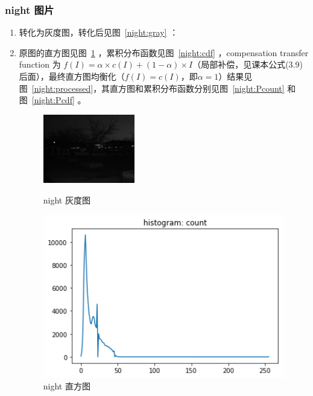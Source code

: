 \documentclass[a4paper,UTF8]{article}
\numberwithin{equation}{section}
\begin{document}
\subsubsection{night 图片}
\begin{enumerate}[(\romannumeral1)]
	\item 转化为灰度图，转化后见图~\ref{night:gray} ：
	\item 原图的直方图见图~\ref{night:count} ，累积分布函数见图~\ref{night:cdf} ，compensation transfer function 为 $f(I)=\alpha×c(I)+(1-\alpha)×I$（局部补偿，见课本公式(3.9)后面），最终直方图均衡化（$f(I)=c(I)，即\alpha=1$）结果见图~\ref{night:processed}，其直方图和累积分布函数分别见图~\ref{night:Pcount} 和图~\ref{night:Pcdf} 。
\begin{figure}[!htbp]
\centering
\begin{minipage}[t]{0.30\textwidth}
\centering
\includegraphics[width=4cm]{night_gray.png}
\caption{night 灰度图}
\label{night:gray}
\end{minipage}
\centering
\begin{minipage}[t]{0.3\textwidth}
\centering
\includegraphics[width=1.0\textwidth]{night_count.png}
\caption{night 直方图}
\label{night:count}
\end{minipage}
\begin{minipage}[t]{0.3\textwidth}
\centering

\end{minipage}
\end{figure}
\end{enumerate}
\end{document}
